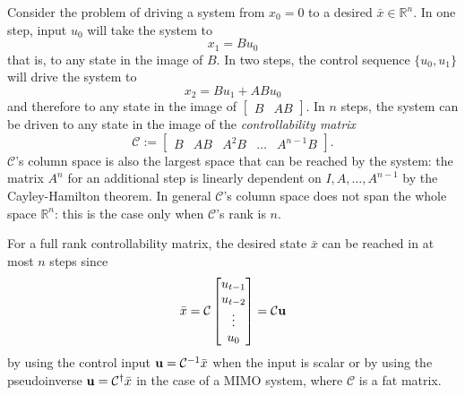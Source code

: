 Consider the problem of driving a system from $x_0=0$ to a desired $\bar{x}\in \mathbb{R}^n$. In one step, input $u_0$ will take the system to
\begin{equation*}
  x_1 = Bu_0
\end{equation*}
that is, to any state in the image of $B$. In two steps, the control sequence $\{u_0,u_1\}$ will drive the system to
\begin{equation*}
  x_2 = Bu_1 + ABu_0
\end{equation*}
and therefore to any state in the image of $\begin{bmatrix}B & AB\end{bmatrix}$. In $n$ steps, the system can be driven to any state in the image of the \emph{controllability matrix}
\begin{equation}
  \label{eq:controllability-matrix}
  \mathcal{C} :=
  \begin{bmatrix}
    B & AB & A^2B & \ldots & A^{n-1}B
  \end{bmatrix}.
\end{equation}
$\mathcal{C}$'s column space is also the largest space that can be reached by the system: the matrix $A^n$ for an additional step is linearly dependent on $I,A,\ldots, A^{n-1}$ by the Cayley-Hamilton theorem. In general $\mathcal{C}$'s column space does not span the whole space $\mathbb{R}^n$: this is the case only when $\mathcal{C}$'s rank is $n$.

For a full rank controllability matrix, the desired state $\bar{x}$ can be reached in at most $n$ steps since
\begin{equation*}
  \bar{x} = \mathcal{C}
  \begin{bmatrix}
    u_{t-1} \\ u_{t-2} \\ \vdots \\ u_0
  \end{bmatrix} = \mathcal{C} \boldsymbol{\mathrm{u}}
\end{equation*}
by using the control input $\boldsymbol{\mathrm{u}} = \mathcal{C}^{-1}\bar{x}$ when the input is scalar or by using the pseudoinverse $\boldsymbol{\mathrm{u}} = \mathcal{C}^\dagger\bar{x}$ in the case of a MIMO system, where $\mathcal{C}$ is a fat matrix.

